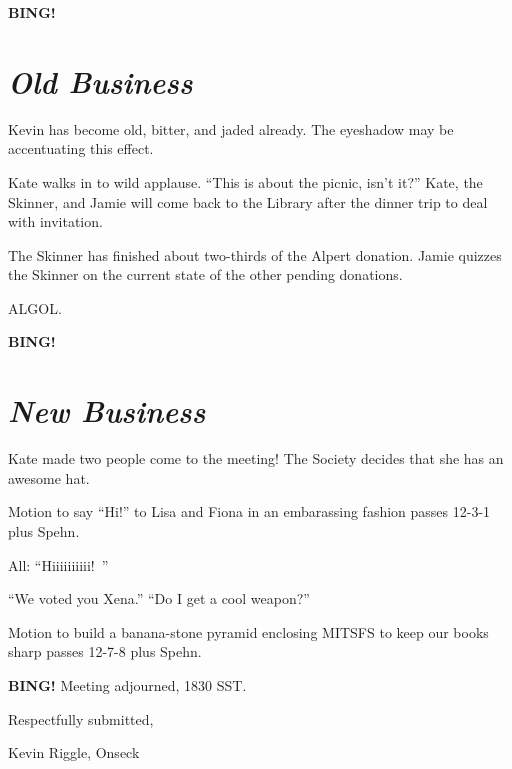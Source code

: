 \documentclass[10pt]{article}
\newcommand{\bing}{{\bf BING!} }
\newcommand{\goto}[1]{\bing \vskip 12pt \section*{{\em{#1}}}}
\newcommand{\ps}{ plus Spehn\xspace}
\begin{document}


\goto{Old Business}
Kevin has become old, bitter, and jaded already.  The eyeshadow may be accentuating this effect.

Kate walks in to wild applause.  ``This is about the picnic, isn't it?''  Kate, the Skinner, and
Jamie will come back to the Library after the dinner trip to deal with invitation.

The Skinner has finished about two-thirds of the Alpert donation.  Jamie quizzes the Skinner on the
current state of the other pending donations.

ALGOL.

\goto{New Business}

Kate made two people come to the meeting!  The Society decides that she has an awesome hat.

Motion to say ``Hi!'' to Lisa and Fiona in an embarassing fashion passes 12-3-1\ps.

All: ``Hiiiiiiiiii!~''

``We voted you Xena.''  ``Do I get a cool weapon?''

Motion to build a banana-stone pyramid enclosing MITSFS to keep our books sharp passes 12-7-8\ps.

\bing
\noindent
Meeting adjourned, 1830 SST.

\vspace{18pt}

\centerline{Respectfully submitted,}
\centerline{Kevin Riggle, Onseck}
\end{document}
